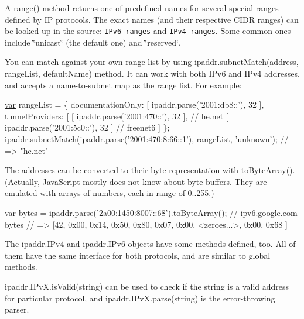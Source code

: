 \hyperlink{class_a}{A} {\ttfamily range()} method returns one of predefined names for several special ranges defined by I\+P protocols. The exact names (and their respective C\+I\+D\+R ranges) can be looked up in the source\+: \href{https://github.com/whitequark/ipaddr.js/blob/master/src/ipaddr.coffee#L186}{\tt I\+Pv6 ranges} and \href{https://github.com/whitequark/ipaddr.js/blob/master/src/ipaddr.coffee#L71}{\tt I\+Pv4 ranges}. Some common ones include {\ttfamily \char`\"{}unicast\char`\"{}} (the default one) and {\ttfamily \char`\"{}reserved\char`\"{}}.

You can match against your own range list by using {\ttfamily ipaddr.\+subnet\+Match(address, range\+List, default\+Name)} method. It can work with both I\+Pv6 and I\+Pv4 addresses, and accepts a name-\/to-\/subnet map as the range list. For example\+:


\begin{DoxyCode}
\hyperlink{018__def_8c_a335628f2e9085305224b4f9cc6e95ed5}{var} rangeList = \{
  documentationOnly: [ ipaddr.parse(\textcolor{stringliteral}{'2001:db8::'}), 32 ],
  tunnelProviders: [
    [ ipaddr.parse(\textcolor{stringliteral}{'2001:470::'}), 32 ], \textcolor{comment}{// he.net}
    [ ipaddr.parse(\textcolor{stringliteral}{'2001:5c0::'}), 32 ]  \textcolor{comment}{// freenet6}
  ]
\};
ipaddr.subnetMatch(ipaddr.parse(\textcolor{stringliteral}{'2001:470:8:66::1'}), rangeList, \textcolor{stringliteral}{'unknown'}); \textcolor{comment}{// => "he.net"}
\end{DoxyCode}


The addresses can be converted to their byte representation with {\ttfamily to\+Byte\+Array()}. (Actually, Java\+Script mostly does not know about byte buffers. They are emulated with arrays of numbers, each in range of 0..255.)


\begin{DoxyCode}
\hyperlink{018__def_8c_a335628f2e9085305224b4f9cc6e95ed5}{var} bytes = ipaddr.parse(\textcolor{stringliteral}{'2a00:1450:8007::68'}).toByteArray(); \textcolor{comment}{// ipv6.google.com}
bytes \textcolor{comment}{// => [42, 0x00, 0x14, 0x50, 0x80, 0x07, 0x00, <zeroes...>, 0x00, 0x68 ]}
\end{DoxyCode}


The {\ttfamily ipaddr.\+I\+Pv4} and {\ttfamily ipaddr.\+I\+Pv6} objects have some methods defined, too. All of them have the same interface for both protocols, and are similar to global methods.

{\ttfamily ipaddr.\+I\+Pv\+X.\+is\+Valid(string)} can be used to check if the string is a valid address for particular protocol, and {\ttfamily ipaddr.\+I\+Pv\+X.\+parse(string)} is the error-\/throwing parser.

